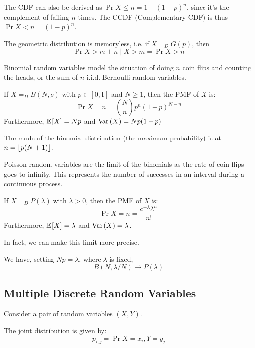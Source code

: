 The CDF can also be derived as $\Pr{X \leq n} = 1 - (1- p)^n$,
since it's the complement of failing $n$ times. The CCDF (Complementary CDF)
is thus $\Pr{X < n} = (1 - p)^n$.

\begin{note}
    The geometric distribution is memoryless, i.e. if $X =_D G(p)$, then
    \[ \Pr{X > m + n \mid X > m} = \Pr{X > n} \]
\end{note}

Binomial random variables model the situation of doing $n$ coin flips and counting the heads,
or the sum of $n$ i.i.d. Bernoulli random variables.
\begin{definition}
    If $X =_D B(N, p)$ with $p \in [0, 1]$ and $N \geq 1$,
    then the PMF of $X$ is:
    \[ \Pr{X = n} = \binom{N}{n} p^n (1-p)^{N - n} \]
    Furthermore,
    $\mathbb{E}\left[ X \right] = Np$ and $\text{Var}\left( X \right) = Np(1 - p)$
\end{definition}
The mode of the binomial distribution (the maximum probability) is at
$n = \left\lfloor p(N + 1) \right\rfloor$.

Poisson random variables are the limit of the binomials as the rate of
coin flips goes to infinity. This represents the number of successes in an interval 
during a continuous process.
\begin{definition}
    If $X =_D P(\lambda)$ with $\lambda > 0$,
    then the PMF of $X$ is:
    \[ \Pr{X = n} = \frac{e^{-\lambda} \lambda^n}{n!} \]
    Furthermore, $\mathbb{E}\left[ X \right] = \lambda$ and $\text{Var}\left( X \right) = \lambda$.
\end{definition}

In fact, we can make this limit more precise.
\begin{theorem}
    We have, setting $Np = \lambda$, where $\lambda$ is fixed,
    \[ B(N, \lambda/N) \to P(\lambda) \]
\end{theorem}

\subsection{Multiple Discrete Random Variables}

Consider a pair of random variables $(X, Y)$.

\begin{definition}
    The joint distribution is given by:
    \[ p_{i, j} = \Pr{X = x_i, Y = y_j} \]
\end{definition}

